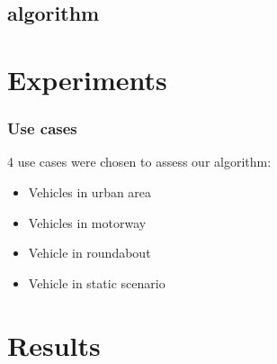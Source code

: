 \documentclass{beamer}
\begin{document}
\subsection{algorithm}


\section{Experiments}

	\begin{frame}
		\frametitle{Use cases}
		4 use cases were chosen to assess our algorithm:
		\begin{itemize}
		\item Vehicles in urban area
		\item Vehicles in motorway
		\item Vehicle in roundabout
		\item Vehicle in static scenario
		\end{itemize}						
	\end{frame}

\section{Results}
\end{document}
